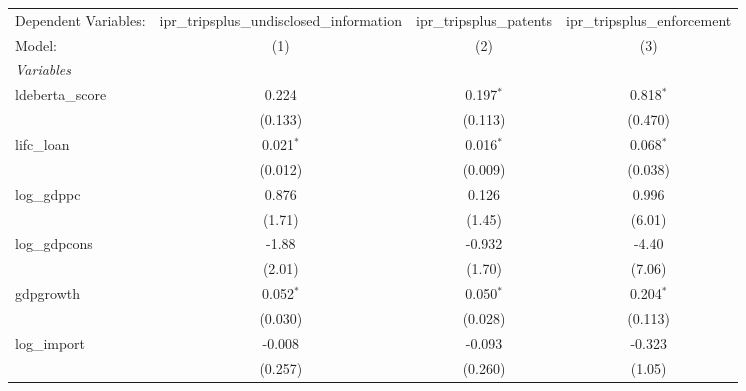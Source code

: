 
\begingroup
\centering
\begin{tabular}{lccc}
   \tabularnewline \midrule \midrule
   Dependent Variables:                   & ipr\_tripsplus\_undisclosed\_information    & ipr\_tripsplus\_patents   & ipr\_tripsplus\_enforcement\\    
   Model:                                 & (1)                                         & (2)                       & (3)\\  
   \midrule
   \emph{Variables}\\
   ldeberta\_score                        & 0.224                                       & 0.197$^{*}$               & 0.818$^{*}$\\   
                                          & (0.133)                                     & (0.113)                   & (0.470)\\   
   lifc\_loan                             & 0.021$^{*}$                                 & 0.016$^{*}$               & 0.068$^{*}$\\   
                                          & (0.012)                                     & (0.009)                   & (0.038)\\   
   log\_gdppc                             & 0.876                                       & 0.126                     & 0.996\\   
                                          & (1.71)                                      & (1.45)                    & (6.01)\\   
   log\_gdpcons                           & -1.88                                       & -0.932                    & -4.40\\   
                                          & (2.01)                                      & (1.70)                    & (7.06)\\   
   gdpgrowth                              & 0.052$^{*}$                                 & 0.050$^{*}$               & 0.204$^{*}$\\   
                                          & (0.030)                                     & (0.028)                   & (0.113)\\   
   log\_import                            & -0.008                                      & -0.093                    & -0.323\\   
                                          & (0.257)                                     & (0.260)                   & (1.05)\\   

\end{tabular}
